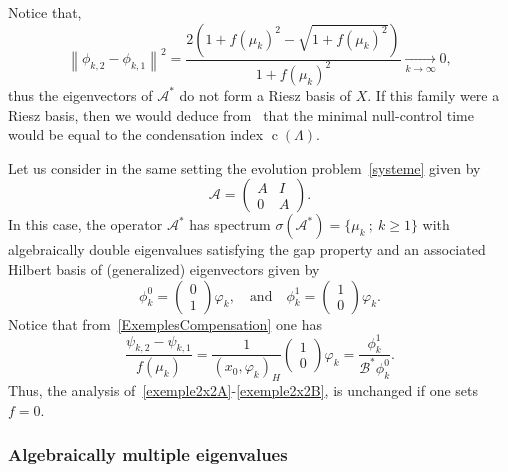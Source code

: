 \documentclass[AHL,Unicode,longabstracts]{cedram}
\newcommand\A{\mathcal{A}}
\newcommand\As{\mathcal{A}^*}
\newcommand\Bs{\mathcal{B}^*}
\newcommand{\normeX}[1]{\left\| #1 \right\|}
\newcommand{\psH}[2]{\left(#1, #2 \right)_H}
\DeclareMathOperator{\cond}{c}
\begin{document}
\begin{rema}
Notice that,
\begin{equation*}\label{ExAcademique1:EstimeeDifferenceVectProp}
\normeX{ \phi_{k,2} - \phi_{k,1} }^2 = \frac{2 \left(1+ f(\mu_k)^2 - \sqrt{1+f(\mu_k)^2} \right)}{1+ f(\mu_k)^2} \underset{k \to \infty}{\longrightarrow} 0,
\end{equation*}
thus the eigenvectors of $\As$ do not form a Riesz basis of $X$. If this family were a Riesz basis, then we would deduce from~\cite{AmmarKhodjaBenabdallahGonzalez-BurgosdeTeresa:2014} that the minimal null-control time would be equal to the condensation index $\cond(\Lambda)$.
\end{rema}

\begin{rema} \label{Rem:SystLimite}
Let us consider in the same setting the evolution problem~\eqref{systeme} given by
\begin{equation*}\label{exempleA}
\A=
\begin{pmatrix} A & I \\ 0 & A
\end{pmatrix}.
\end{equation*}
In this case, the operator $\As$ has spectrum $ \sigma(\As)=\{ \mu_k \: ; \: k \geq 1\}$ with algebraically double eigenvalues satisfying the gap property and an associated Hilbert basis of (generalized) eigenvectors given by
\[
\phi_k^0=
\begin{pmatrix} 0 \\ 1
\end{pmatrix} \varphi_k,
\quad \text{and} \quad
\phi_k^1=
\begin{pmatrix} 1 \\ 0
\end{pmatrix} \varphi_k.
\]
Notice that from~\eqref{ExemplesCompensation} one has
\[
\frac{\psi_{k,2}- \psi_{k,1}}{f(\mu_k)} = \frac{1}{\psH{x_0}{\varphi_k}}
\begin{pmatrix} 1 \\ 0
\end{pmatrix} \varphi_k = \frac{\phi_k^1}{\Bs \phi_k^0}.
\]
Thus, the analysis of~\eqref{exemple2x2A}-\eqref{exemple2x2B}, is unchanged if one sets $f=0$.
\end{rema}



\subsubsection{Algebraically multiple eigenvalues}\label{secexample3x2+1}
\end{document}
